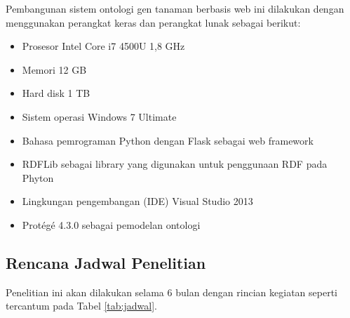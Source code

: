 Pembangunan sistem ontologi gen tanaman berbasis web ini dilakukan dengan menggunakan perangkat keras dan perangkat lunak sebagai berikut:

\begin{itemize}
	\item Prosesor Intel Core i7 4500U 1,8 GHz
	\item Memori 12 GB
	\item Hard disk 1 TB
	\item Sistem operasi Windows 7 Ultimate
	\item Bahasa pemrograman Python dengan Flask sebagai web framework
	\item RDFLib sebagai library yang digunakan untuk penggunaan RDF pada Phyton
	\item Lingkungan pengembangan (IDE) Visual Studio 2013 
	\item Protégé 4.3.0 sebagai pemodelan ontologi
\end{itemize}

\subsection*{Rencana Jadwal Penelitian}

Penelitian ini akan dilakukan selama 6 bulan dengan rincian kegiatan seperti tercantum pada Tabel \ref{tab:jadwal}.


